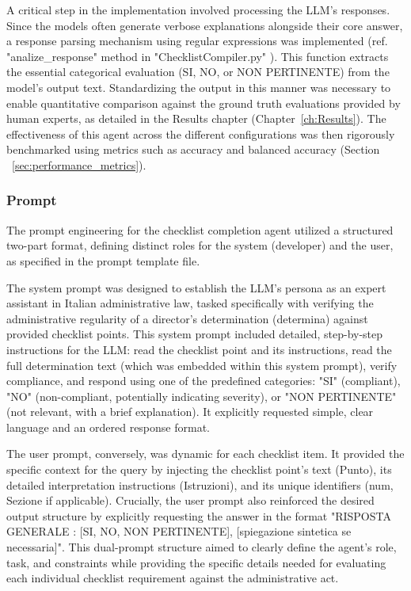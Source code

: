 \documentclass[../main.tex]{subfiles}
\begin{document}
A critical step in the implementation involved processing the LLM's responses. Since the models often generate verbose explanations alongside their core answer, a response parsing mechanism using regular expressions was implemented (ref. "analize\_response" method in "ChecklistCompiler.py" ). This function extracts the essential categorical evaluation (SI, NO, or NON PERTINENTE) from the model's output text. Standardizing the output in this manner was necessary to enable quantitative comparison against the ground truth evaluations provided by human experts, as detailed in the Results chapter (Chapter~\ref{ch:Results}). The effectiveness of this agent across the different configurations was then rigorously benchmarked using metrics such as accuracy and balanced accuracy (Section ~\ref{sec:performance_metrics}).


\subsubsection{Prompt}
The prompt engineering for the checklist completion agent utilized a structured two-part format, defining distinct roles for the system (developer) and the user, as specified in the prompt template file. 

The system prompt was designed to establish the LLM's persona as an expert assistant in Italian administrative law, tasked specifically with verifying the administrative regularity of a director's determination (determina) against provided checklist points. This system prompt included detailed, step-by-step instructions for the LLM: read the checklist point and its instructions, read the full determination text (which was embedded within this system prompt), verify compliance, and respond using one of the predefined categories: "SI" (compliant), "NO" (non-compliant, potentially indicating severity), or "NON PERTINENTE" (not relevant, with a brief explanation). It explicitly requested simple, clear language and an ordered response format. 

The user prompt, conversely, was dynamic for each checklist item. It provided the specific context for the query by injecting the checklist point's text (Punto), its detailed interpretation instructions (Istruzioni), and its unique identifiers (num, Sezione if applicable). Crucially, the user prompt also reinforced the desired output structure by explicitly requesting the answer in the format "RISPOSTA GENERALE : [SI, NO, NON PERTINENTE], [spiegazione sintetica se necessaria]". This dual-prompt structure aimed to clearly define the agent's role, task, and constraints while providing the specific details needed for evaluating each individual checklist requirement against the administrative act.   
\end{document}
